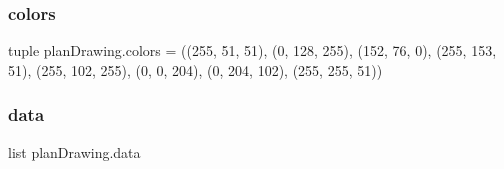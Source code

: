 \mbox{\label{namespaceplan_drawing_aaf34615559207ed0d1b747c94b27b5ba}} 
\subsubsection{\texorpdfstring{colors}{colors}}
{\footnotesize\ttfamily tuple plan\+Drawing.\+colors = ((255, 51, 51), (0, 128, 255), (152, 76, 0), (255, 153, 51), (255, 102, 255), (0, 0, 204), (0, 204, 102), (255, 255, 51))}

\mbox{\label{namespaceplan_drawing_a622e05718ba4ee2b68d34059300226c1}} 
\subsubsection{\texorpdfstring{data}{data}}
{\footnotesize\ttfamily list plan\+Drawing.\+data}


